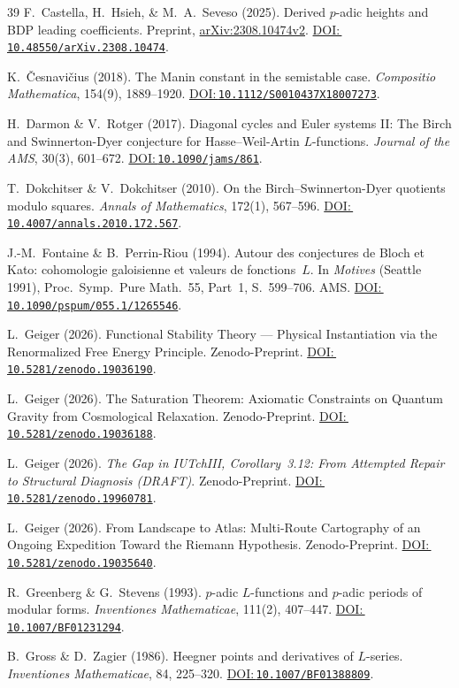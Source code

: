 \documentclass[aps,prd,twocolumn,superscriptaddress,nofootinbib,floatfix]{revtex4-2}
\newcommand{\doilink}[1]{\href{https://doi.org/#1}{DOI:\,\nolinkurl{#1}}}
\theoremstyle{definition}
\theoremstyle{remark}
\begin{document}
\begin{thebibliography}{39}
F.~Castella, H.~Hsieh, \& M.~A.~Seveso (2025).
Derived $p$-adic heights and BDP leading coefficients.
Preprint, \href{https://arxiv.org/abs/2308.10474v2}{arXiv:2308.10474v2}.
\doilink{10.48550/arXiv.2308.10474}.

K.~Česnavičius (2018).
The Manin constant in the semistable case.
\textit{Compositio Mathematica}, 154(9), 1889--1920.
\doilink{10.1112/S0010437X18007273}.

H.~Darmon \& V.~Rotger (2017).
Diagonal cycles and Euler systems II: The Birch and Swinnerton-Dyer conjecture for Hasse--Weil-Artin $L$-functions.
\textit{Journal of the AMS}, 30(3), 601--672.
\doilink{10.1090/jams/861}.

T.~Dokchitser \& V.~Dokchitser (2010).
On the Birch--Swinnerton-Dyer quotients modulo squares.
\textit{Annals of Mathematics}, 172(1), 567--596.
\doilink{10.4007/annals.2010.172.567}.

J.-M.~Fontaine \& B.~Perrin-Riou (1994).
Autour des conjectures de Bloch et Kato: cohomologie galoisienne et valeurs de fonctions~$L$.
In \textit{Motives} (Seattle 1991), Proc.\ Symp.\ Pure Math.\ 55, Part~1, S.\ 599--706. AMS.
\doilink{10.1090/pspum/055.1/1265546}.

L.~Geiger (2026).
Functional Stability Theory --- Physical Instantiation via the Renormalized Free Energy Principle.
Zenodo-Preprint.
\doilink{10.5281/zenodo.19036190}.

L.~Geiger (2026).
The Saturation Theorem: Axiomatic Constraints on Quantum Gravity from Cosmological Relaxation.
Zenodo-Preprint.
\doilink{10.5281/zenodo.19036188}.

L.~Geiger (2026).
\textit{The Gap in IUTchIII, Corollary~3.12: From Attempted Repair to Structural Diagnosis (DRAFT)}.
Zenodo-Preprint.
\doilink{10.5281/zenodo.19960781}.

L.~Geiger (2026).
From Landscape to Atlas: Multi-Route Cartography of an Ongoing Expedition Toward the Riemann Hypothesis.
Zenodo-Preprint.
\doilink{10.5281/zenodo.19035640}.

R.~Greenberg \& G.~Stevens (1993).
$p$-adic $L$-functions and $p$-adic periods of modular forms.
\textit{Inventiones Mathematicae}, 111(2), 407--447.
\doilink{10.1007/BF01231294}.

B.~Gross \& D.~Zagier (1986).
Heegner points and derivatives of $L$-series.
\textit{Inventiones Mathematicae}, 84, 225--320.
\doilink{10.1007/BF01388809}.


\end{thebibliography}
\end{document}
